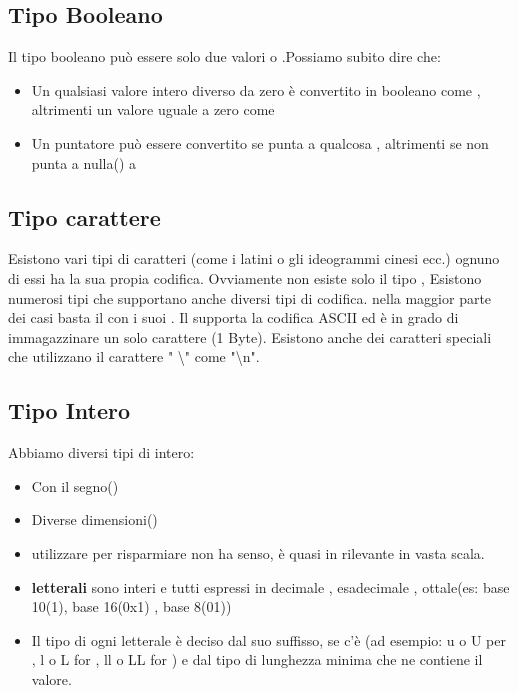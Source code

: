 \subsection{Tipo Booleano}
Il tipo booleano può essere solo due valori \textcolor{blue}{} o \textcolor{blue}{}.\newline Possiamo subito dire che: 
\begin{itemize}
    \item Un qualsiasi valore intero diverso da zero è convertito in booleano come  \textcolor{blue}{}, altrimenti un valore uguale a zero come  \textcolor{blue}{}
    
    \item Un puntatore può essere convertito  se punta a qualcosa , altrimenti se non punta a nulla() a 
\end{itemize}

\subsection{Tipo carattere}
Esistono vari tipi di caratteri (come i latini o gli ideogrammi cinesi ecc.) ognuno di essi ha la sua propia codifica.\newline\newline
Ovviamente non esiste solo il tipo , Esistono numerosi tipi che supportano anche diversi tipi di codifica. nella maggior parte dei casi basta il  con i suoi . \newline\newline
Il  supporta la codifica ASCII ed è in grado di immagazzinare un solo carattere (1 Byte). \newline\newline
Esistono anche dei caratteri speciali che utilizzano il carattere " \textbackslash " come "\textbackslash n".
\newpage
\subsection{Tipo Intero}
Abbiamo diversi tipi di intero:
\begin{itemize}
    \item Con il segno()
    \item Diverse dimensioni()
\end{itemize}
\begin{itemize}
    \item utilizzare  per risparmiare  non ha senso, è quasi in rilevante in vasta scala.
    \item \textbf{letterali} sono interi e tutti espressi in decimale , esadecimale , ottale(es: base 10(1), base 16(0x1) , base 8(01))
    \item Il tipo di ogni letterale è deciso dal suo suffisso, se c’è (ad
    esempio: u o U per , l o L for , ll o LL for ) e dal tipo di lunghezza minima che ne contiene il
    valore.

\end{itemize}


